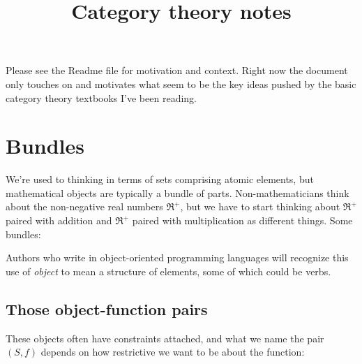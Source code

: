 \documentclass[11pt]{article}
\begin{document}


\title{Category theory notes}
\maketitle

Please see the Readme file for motivation and context. Right now the document only touches
on and motivates what seem to be the key ideas pushed by the basic category theory
textbooks I've been reading.

\section{Bundles}\label{bundlesec}
We're used to thinking in terms of sets comprising atomic elements, but mathematical
objects are typically a bundle of parts. Non-mathematicians think about the non-negative real numbers
$\Re^+$, but we have to start thinking about $\Re^+$ paired with addition and $\Re^+$
paired with multiplication as different things. Some bundles:


Authors who write in object-oriented programming languages will recognize this
use of {\em object} to mean a structure of elements, some of which could be verbs.

\subsection{Those object-function pairs}
These objects often have constraints attached, and what we name the pair $(S, f)$ depends on
how restrictive we want to be about the function:

\end{document}
